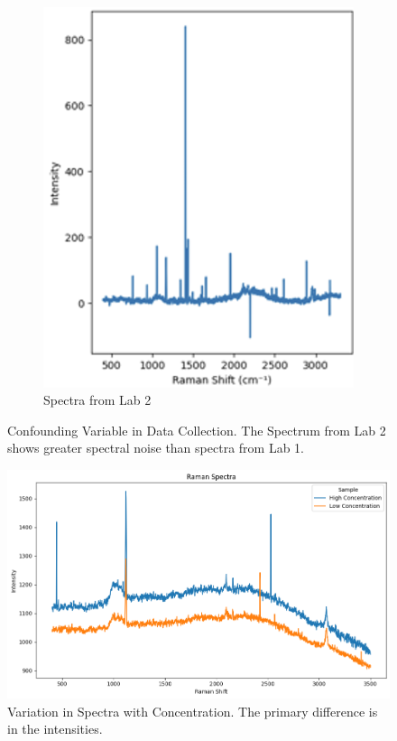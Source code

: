 \begin{figure}[htbp]
\begin{subfigure}[b]{0.45\textwidth}
    \includegraphics[scale=0.6]{Figures/Sampath.png}
    \caption{Spectra from Lab 2}
    \label{fig:sampath}
  \end{subfigure}
  \caption{Confounding Variable in Data Collection. The Spectrum from Lab 2 shows greater spectral noise than spectra from Lab 1.}
  \label{fig:combined3}
\end{figure}

\begin{figure}
    \centering
    \includegraphics[scale = 0.5]{Figures/concentration variation.png}
    \caption{Variation in Spectra with Concentration. The primary difference is in the intensities.}
    \label{fig:conc}
\end{figure}